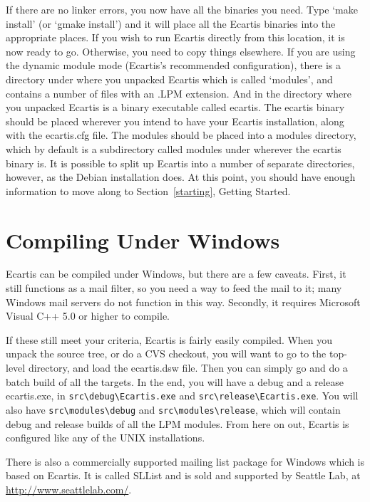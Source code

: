 \documentclass{book}
\begin{document}
   
If there are no linker errors, you now have all the binaries you need.  Type
`make install' (or `gmake install') and it will place all the Ecartis binaries
into the appropriate places.  If you wish to run Ecartis directly from this
location, it is now ready to go.  Otherwise, you need to copy things
elsewhere.  If you are using the dynamic module mode (Ecartis's recommended
configuration), there is a directory under where you unpacked Ecartis which is
called `modules', and contains a number of files with an .LPM extension.  And
in the directory where you unpacked Ecartis is a binary executable called
ecartis.  The ecartis binary should be placed wherever you intend to have your
Ecartis installation, along with the ecartis.cfg file.  The modules should be
placed into a modules directory, which by default is a subdirectory called
modules under wherever the ecartis binary is.  It is possible to split up
Ecartis into a number of separate directories, however, as the Debian
installation does.  At this point, you should have enough information to move
along to Section~\ref{starting}, Getting Started.
   
\section{Compiling Under Windows}
\label{install:windows}

Ecartis can be compiled under Windows, but there are a few caveats.  First, it
still functions as a mail filter, so you need a way to feed the mail to it;
many Windows mail servers do not function in this way.  Secondly, it requires
Microsoft Visual C++ 5.0 or higher to compile.

If these still meet your criteria, Ecartis is fairly easily compiled.  When you
unpack the source tree, or do a CVS checkout, you will want to go to the
top-level directory, and load the ecartis.dsw file.  Then you can simply go and
do a batch build of all the targets.  In the end, you will have a debug and a
release ecartis.exe, in \verb+src\debug\Ecartis.exe+ and
\verb+src\release\Ecartis.exe+.  You will also have \verb+src\modules\debug+
and \verb+src\modules\release+, which will contain debug and release builds of
all the LPM modules.  From here on out, Ecartis is configured like any of the
UNIX installations.
   
There is also a commercially supported mailing list package for Windows which
is based on Ecartis.  It is called SLList and is sold and supported by Seattle
Lab, at \href{http://www.seattlelab.com/}{http://www.seattlelab.com/}.
\end{document}
